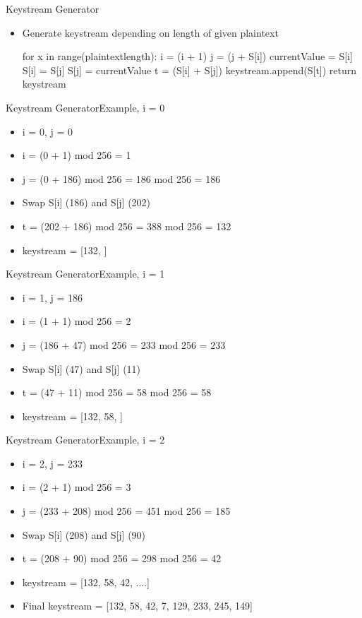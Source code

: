 \documentclass[
	aspectratio=169,	%
	onlytextwidth,		%
	t,					%
	]{beamer}
\begin{document}
\begin{frame}[fragile]{Keystream Generator}
	\begin{itemize}
		\item Generate keystream depending on length of given plaintext
		\begin{python}
   			for x in range(plaintextlength):
				i = (i + 1) %
				j = (j + S[i]) %
				currentValue = S[i]
				S[i] = S[j]
				S[j] = currentValue
				t = (S[i] + S[j]) %
				keystream.append(S[t])
    		return keystream
		\end{python}
	\end{itemize}
\end{frame}

\begin{frame}[fragile]{Keystream Generator}{Example, i = 0}
	\begin{itemize}
		\item i = 0, j = 0
		\item i = (0 + 1) mod 256 = 1
		\item j = (0 + 186) mod 256 = 186 mod 256 = 186
		\item Swap S[i] (186) and S[j] (202)
		\item t = (202 + 186) mod 256 = 388 mod 256 = 132
		\item keystream = [132, ]
	\end{itemize}
\end{frame}

\begin{frame}[fragile]{Keystream Generator}{Example, i = 1}
	\begin{itemize}
		\item i = 1, j = 186
		\item i = (1 + 1) mod 256 = 2
		\item j = (186 + 47) mod 256 = 233 mod 256 = 233
		\item Swap S[i] (47) and S[j] (11)
		\item t = (47 + 11) mod 256 = 58 mod 256 = 58
		\item keystream = [132, 58, ]
	\end{itemize}
\end{frame}

\begin{frame}[fragile]{Keystream Generator}{Example, i = 2}
	\begin{itemize}
		\item i = 2, j = 233
		\item i = (2 + 1) mod 256 = 3
		\item j = (233 + 208) mod 256 = 451 mod 256 = 185
		\item Swap S[i] (208) and S[j] (90)
		\item t = (208 + 90) mod 256 = 298 mod 256 = 42
		\item keystream = [132, 58, 42, ....]
		\item Final keystream = [132, 58, 42, 7, 129, 233, 245, 149]
	\end{itemize}
\end{frame}
\end{document}

